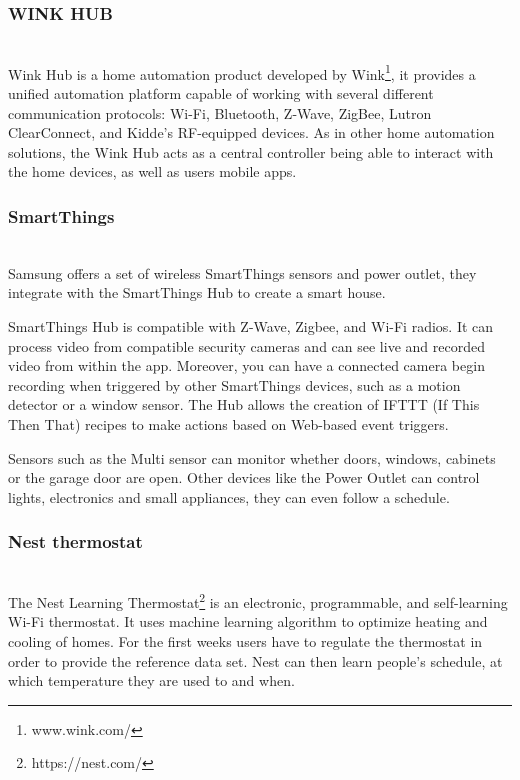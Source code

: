 \subsubsection{WINK HUB}\mbox{}\\

Wink Hub is a home automation product developed by Wink\footnote{www.wink.com/}, it provides a unified automation platform capable of working with several different communication protocols: Wi-Fi, Bluetooth, Z-Wave, ZigBee, Lutron ClearConnect, and Kidde's RF-equipped devices.
As in other home automation solutions, the Wink Hub acts as a central controller being able to interact with the home devices, as well as users mobile apps.

\subsubsection{SmartThings}\mbox{}\\

Samsung offers a set of wireless SmartThings sensors and power outlet, they integrate with the SmartThings Hub to create a smart house.

SmartThings Hub is compatible with Z-Wave, Zigbee, and Wi-Fi radios. It can process video from compatible security cameras and can see live and recorded video from within the app. Moreover, you can have a connected camera begin recording when triggered by other SmartThings devices, such as a motion detector or a window sensor. 
The Hub allows the creation of IFTTT (If This Then That) recipes to make actions based on Web-based event triggers.

Sensors such as the Multi sensor can monitor whether doors, windows, cabinets or the garage door are open. Other devices like the Power Outlet can control lights, electronics and small appliances, they can even follow a schedule.


\subsubsection{Nest thermostat}\mbox{}\\


The Nest Learning Thermostat\footnote{https://nest.com/} is an electronic, programmable, and self-learning Wi-Fi thermostat. It uses machine learning algorithm to optimize  heating and cooling of homes. For the first weeks users have to regulate the thermostat in order to provide the reference data set. Nest can then learn people's schedule, at which temperature they are used to and when. 




